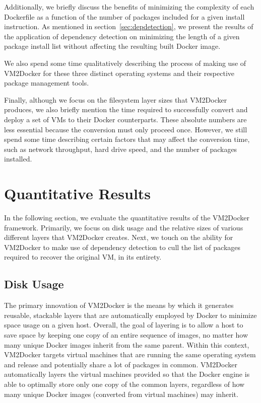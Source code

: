 Additionally, we briefly discuss the benefits of minimizing the complexity of each Dockerfile as a function of the number of packages included for a given install instruction. As mentioned in section~\ref{sec:depdetection}, we present the results of the application of dependency detection on minimizing the length of a given package install list without affecting the resulting built Docker image.

We also spend some time qualitatively describing the process of making use of VM2Docker for these three distinct operating systems and their respective package management tools.

Finally, although we focus on the filesystem layer sizes that VM2Docker produces, we also briefly mention the time required to successfully convert and deploy a set of VMs to their Docker counterparts. These absolute numbers are less essential because the conversion must only proceed once. However, we still spend some time describing certain factors that may affect the conversion time, such as network throughput, hard drive speed, and the number of packages installed.



\section{Quantitative Results}
\label{sec:evalquant}
In the following section, we evaluate the quantitative results of the VM2Docker framework. Primarily, we focus on disk usage and the relative sizes of various different layers that VM2Docker creates. Next, we touch on the ability for VM2Docker to make use of dependency detection to cull the list of packages required to recover the original VM, in its entirety.

\subsection{Disk Usage}
The primary innovation of VM2Docker is the means by which it generates reusable, stackable layers that are automatically employed by Docker to minimize space usage on a given host. Overall, the goal of layering is to allow a host to save space by keeping one copy of an entire sequence of images, no matter how many unique Docker images inherit from the same parent. Within this context, VM2Docker targets virtual machines that are running the same operating system and release and potentially share a lot of packages in common. VM2Docker automatically layers the virtual machines provided so that the Docker engine is able to optimally store only one copy of the common layers, regardless of how many unique Docker images (converted from virtual machines) may inherit.

